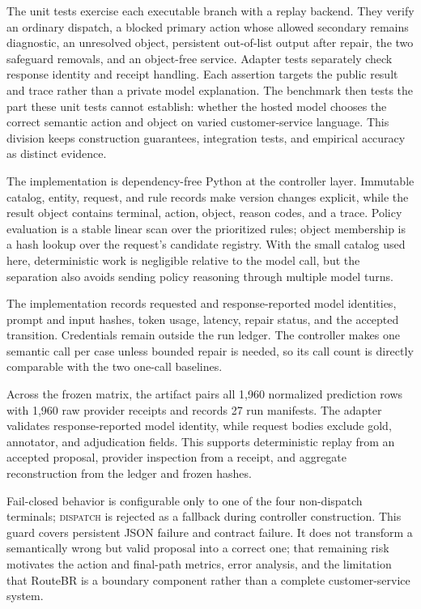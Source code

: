 \documentclass[10pt,conference,a4paper]{IEEEtran}
\newcommand{\method}{RouteBR}
\begin{document}
The unit tests exercise each executable branch with a replay backend. They verify an ordinary dispatch, a blocked primary action whose allowed secondary remains diagnostic, an unresolved object, persistent out-of-list output after repair, the two safeguard removals, and an object-free service. Adapter tests separately check response identity and receipt handling. Each assertion targets the public result and trace rather than a private model explanation. The benchmark then tests the part these unit tests cannot establish: whether the hosted model chooses the correct semantic action and object on varied customer-service language. This division keeps construction guarantees, integration tests, and empirical accuracy as distinct evidence.

The implementation is dependency-free Python at the controller layer. Immutable catalog, entity, request, and rule records make version changes explicit, while the result object contains terminal, action, object, reason codes, and a trace. Policy evaluation is a stable linear scan over the prioritized rules; object membership is a hash lookup over the request's candidate registry. With the small catalog used here, deterministic work is negligible relative to the model call, but the separation also avoids sending policy reasoning through multiple model turns.

The implementation records requested and response-reported model identities, prompt and input hashes, token usage, latency, repair status, and the accepted transition. Credentials remain outside the run ledger. The controller makes one semantic call per case unless bounded repair is needed, so its call count is directly comparable with the two one-call baselines.

Across the frozen matrix, the artifact pairs all 1,960 normalized prediction rows with 1,960 raw provider receipts and records 27 run manifests. The adapter validates response-reported model identity, while request bodies exclude gold, annotator, and adjudication fields. This supports deterministic replay from an accepted proposal, provider inspection from a receipt, and aggregate reconstruction from the ledger and frozen hashes.

Fail-closed behavior is configurable only to one of the four non-dispatch terminals; \textsc{dispatch} is rejected as a fallback during controller construction. This guard covers persistent JSON failure and contract failure. It does not transform a semantically wrong but valid proposal into a correct one; that remaining risk motivates the action and final-path metrics, error analysis, and the limitation that \method{} is a boundary component rather than a complete customer-service system.
\end{document}
